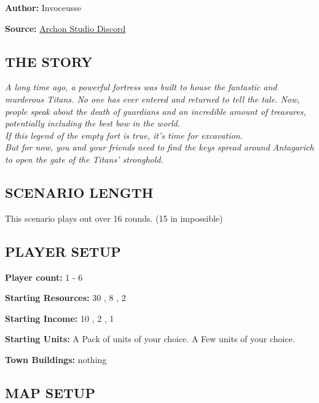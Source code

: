 
\begin{multicols*}{2}

\textbf{Author:} Invoceusse

\textbf{Source:} \href{https://discord.com/channels/740870068178649108/1219333721019256943}{Archon Studio Discord}

\subsection*{\MakeUppercase{The story}}
\textit{A long time ago, a powerful fortress was built to house the fantastic and murderous Titans.
  No one has ever entered and returned to tell the tale.
  Now, people speak about the death of guardians and an incredible amount of treasures, potentially including the best bow in the world.\\
  If this legend of the empty fort is true, it's time for excavation.\\
  But for now, you and your friends need to find the keys spread around Antagarich to open the gate of the Titans' stronghold.
}
\subsection*{\MakeUppercase{Scenario length}}

This scenario plays out over 16 rounds. (15 in impossible)

\subsection*{\MakeUppercase{Player setup}}

\textbf{Player count:} 1 - 6

\textbf{Starting Resources:} 30 , 8 , 2 

\textbf{Starting Income:} 10 , 2 , 1 

\textbf{Starting Units:} 
    A Pack of  units of your choice.
    A Few  units of your choice.

\textbf{Town Buildings:} nothing

\subsection*{\MakeUppercase{Map setup}}


\end{multicols*}
